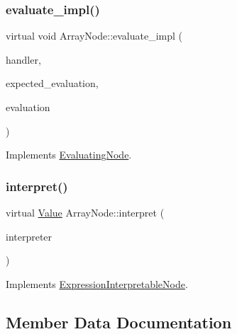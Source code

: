 \subsubsection{\texorpdfstring{evaluate\+\_\+impl()}{evaluate\_impl()}}
{\footnotesize\ttfamily virtual void Array\+Node\+::evaluate\+\_\+impl (\begin{DoxyParamCaption}\item[{\hyperlink{classSystemHandler}{System\+Handler} $\ast$}]{handler,  }\item[{\hyperlink{statics_8h_a6664c451ca7787483a7981cc1de68dbb}{E\+V\+A\+L\+U\+A\+T\+I\+O\+N\+\_\+\+T\+Y\+PE}}]{expected\+\_\+evaluation,  }\item[{struct \hyperlink{structEvaluation}{Evaluation} $\ast$}]{evaluation }\end{DoxyParamCaption})\hspace{0.3cm}{\ttfamily [virtual]}}



Implements \hyperlink{classEvaluatingNode_a085fa06e0b46a93c814dc55cda0c1b26}{Evaluating\+Node}.

\mbox{\label{classArrayNode_a029220b946233e22cb661fcfac9634d0}} 
\subsubsection{\texorpdfstring{interpret()}{interpret()}}
{\footnotesize\ttfamily virtual \hyperlink{classValue}{Value} Array\+Node\+::interpret (\begin{DoxyParamCaption}\item[{\hyperlink{classInterpreter}{Interpreter} $\ast$}]{interpreter }\end{DoxyParamCaption})\hspace{0.3cm}{\ttfamily [virtual]}}



Implements \hyperlink{classExpressionInterpretableNode_a43650f046c48fc539f77a207e3c9181e}{Expression\+Interpretable\+Node}.



\subsection{Member Data Documentation}
\mbox{\label{classArrayNode_a949140f67149544aec59044dcae07036}} 
